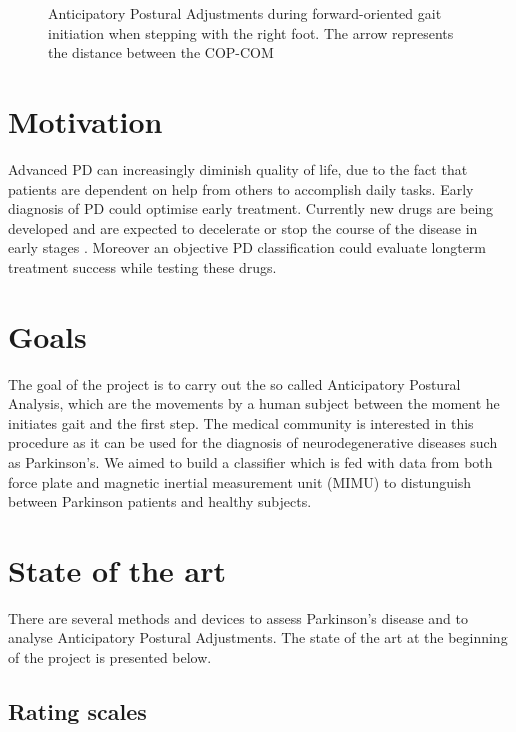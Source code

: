 \begin{figure}
	\centering
	\caption{Anticipatory Postural Adjustments during forward-oriented gait initiation when stepping with the right foot. The arrow represents the distance between the COP-COM \cite{hass_gait_2005-1}}
	\label{fig:APAoverview}
\end{figure}


\section{Motivation}

Advanced PD can increasingly diminish quality of life, due to the fact that patients are dependent on help from others to accomplish daily tasks. Early diagnosis of PD could optimise early treatment. Currently new drugs are being developed and are expected to decelerate or stop the course of the disease in early stages \cite{botzel_motivation_2014}. Moreover an objective PD classification could evaluate longterm treatment success while testing these drugs.


\section{Goals}

The goal of the project is to carry out the so called Anticipatory Postural Analysis, which are the movements by a human subject between the moment he initiates gait and the first step. The medical community is interested in this procedure as it can be used for the diagnosis of neurodegenerative diseases such as Parkinson's. We aimed to build a classifier which is fed with data from both force plate and magnetic inertial measurement unit (MIMU) to distunguish between Parkinson patients and healthy subjects.


\section{State of the art}

There are several methods and devices to assess Parkinson's disease and to analyse Anticipatory Postural Adjustments. The state of the art at the beginning of the project is presented below.

\subsection{Rating scales}

